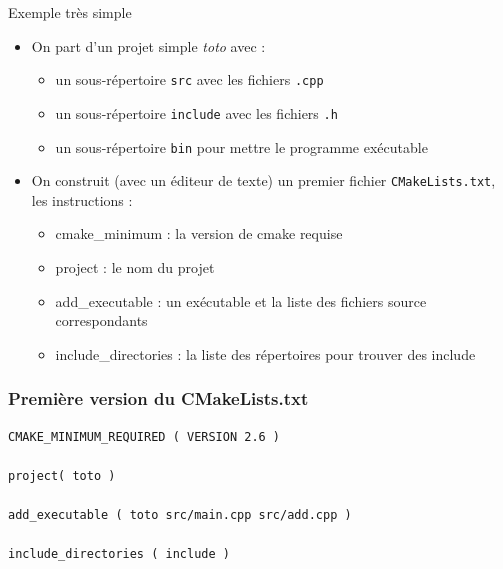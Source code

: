 \begin{frame}{Exemple très simple}

\begin{itemize}
\itemsep1pt\parskip0pt
\item
  On part d'un projet simple \emph{toto} avec :

  \begin{itemize}
  \itemsep1pt\parskip0pt
  \item
    un sous-répertoire \texttt{src} avec les fichiers \texttt{.cpp}
  \item
    un sous-répertoire \texttt{include} avec les fichiers \texttt{.h}
  \item
    un sous-répertoire \texttt{bin} pour mettre le programme exécutable
  \end{itemize}
\item
  On construit (avec un éditeur de texte) un premier fichier
  \texttt{CMakeLists.txt}, les instructions :

  \begin{itemize}
  \itemsep1pt\parskip0pt
  \item
    cmake\_minimum : la version de cmake requise
  \item
    project : le nom du projet
  \item
    add\_executable : un exécutable et la liste des fichiers source
    correspondants
  \item
    include\_directories : la liste des répertoires pour trouver des
    include
  \end{itemize}
\end{itemize}

\end{frame}

\begin{frame}[fragile]\frametitle{Première version du CMakeLists.txt}
\begin{verbatim}
CMAKE_MINIMUM_REQUIRED ( VERSION 2.6 )

project( toto )

add_executable ( toto src/main.cpp src/add.cpp )

include_directories ( include )
\end{verbatim}

\end{frame}

